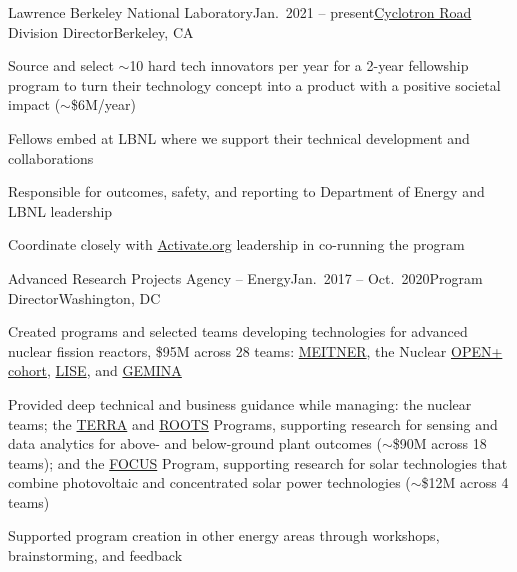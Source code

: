 \begin{rSubsection}{Lawrence Berkeley National Laboratory}{Jan.\ 2021 -- present}{\href{https://cyclotronroad.lbl.gov/}{Cyclotron Road} Division Director}{Berkeley, CA}
\item Source and select $\sim$10 hard tech innovators per year for a 2-year fellowship program to turn their technology concept into a product with a positive societal impact ($\sim$\$6M/year) 
\item Fellows embed at LBNL where we support their technical development and collaborations
\item Responsible for outcomes, safety, and reporting to Department of Energy and LBNL leadership
\item Coordinate closely with \href{https://www.activate.org/}{Activate.org} leadership in co-running the program
\end{rSubsection}


\begin{rSubsection}{Advanced Research Projects Agency -- Energy}{Jan.\ 2017 -- Oct.\ 2020}{Program Director}{Washington, DC}
\item Created programs and selected teams developing technologies for advanced nuclear fission reactors, \$95M across 28 teams: 
\href{https://arpa-e.energy.gov/?q=arpa-e-programs/meitner}{MEITNER}, the
Nuclear
\href{https://arpa-e.energy.gov/?q=news-item/arpa-e-announces-12-million-five-projects-nuclear-materials-science}{OPEN+
cohort},
\href{https://arpa-e.energy.gov/?q=news-item/arpa-e-innovating-through-unconventional-ideas}{LISE}, and  \href{https://arpa-e.energy.gov/technologies/programs/gemina}{GEMINA}
\item Provided deep technical and business guidance while managing: the nuclear teams; the \href{https://arpa-e.energy.gov/?q=arpa-e-programs/terra}{TERRA} and \href{https://arpa-e.energy.gov/?q=arpa-e-programs/roots}{ROOTS} Programs, supporting research for sensing and data analytics for above- and below-ground plant outcomes ($\sim$\$90M across 18 teams); and the \href{https://arpa-e.energy.gov/?q=arpa-e-programs/focus}{FOCUS} Program, supporting research for solar technologies that combine photovoltaic and concentrated solar power technologies ($\sim$\$12M across 4 teams)
\item Supported program creation in other energy areas through workshops, brainstorming, and feedback  
\end{rSubsection}


